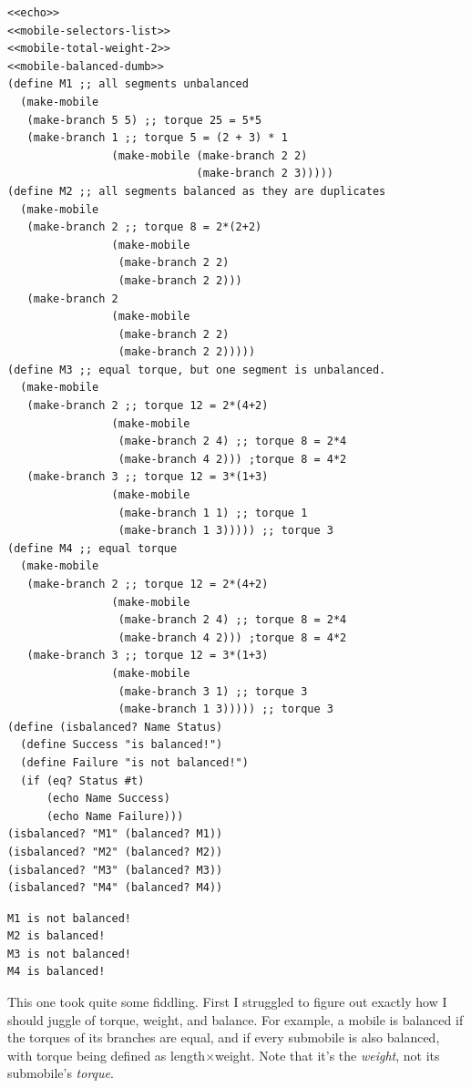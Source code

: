 \documentclass[final,fleqn,titlepage,twoside]{article}
\begin{document}
\begin{verbatim}
<<echo>>
<<mobile-selectors-list>>
<<mobile-total-weight-2>>
<<mobile-balanced-dumb>>
(define M1 ;; all segments unbalanced
  (make-mobile
   (make-branch 5 5) ;; torque 25 = 5*5
   (make-branch 1 ;; torque 5 = (2 + 3) * 1
                (make-mobile (make-branch 2 2)
                             (make-branch 2 3)))))
(define M2 ;; all segments balanced as they are duplicates
  (make-mobile
   (make-branch 2 ;; torque 8 = 2*(2+2)
                (make-mobile
                 (make-branch 2 2)
                 (make-branch 2 2)))
   (make-branch 2
                (make-mobile
                 (make-branch 2 2)
                 (make-branch 2 2)))))
(define M3 ;; equal torque, but one segment is unbalanced.
  (make-mobile
   (make-branch 2 ;; torque 12 = 2*(4+2)
                (make-mobile
                 (make-branch 2 4) ;; torque 8 = 2*4
                 (make-branch 4 2))) ;torque 8 = 4*2
   (make-branch 3 ;; torque 12 = 3*(1+3)
                (make-mobile
                 (make-branch 1 1) ;; torque 1
                 (make-branch 1 3))))) ;; torque 3
(define M4 ;; equal torque
  (make-mobile
   (make-branch 2 ;; torque 12 = 2*(4+2)
                (make-mobile
                 (make-branch 2 4) ;; torque 8 = 2*4
                 (make-branch 4 2))) ;torque 8 = 4*2
   (make-branch 3 ;; torque 12 = 3*(1+3)
                (make-mobile
                 (make-branch 3 1) ;; torque 3
                 (make-branch 1 3))))) ;; torque 3
(define (isbalanced? Name Status)
  (define Success "is balanced!")
  (define Failure "is not balanced!")
  (if (eq? Status #t)
      (echo Name Success)
      (echo Name Failure)))
(isbalanced? "M1" (balanced? M1))
(isbalanced? "M2" (balanced? M2))
(isbalanced? "M3" (balanced? M3))
(isbalanced? "M4" (balanced? M4))
\end{verbatim}

\begin{verbatim}
M1 is not balanced! 
M2 is balanced! 
M3 is not balanced! 
M4 is balanced! 
\end{verbatim}

This one took quite some fiddling. First I struggled to figure out exactly how I
should juggle of torque, weight, and balance. For example, a mobile is balanced
if the torques of its branches are equal, and if every submobile is also
balanced, with torque being defined as length\(\times\)weight. Note that it's
the \emph{weight}, not its submobile's \emph{torque}.
\end{document}
